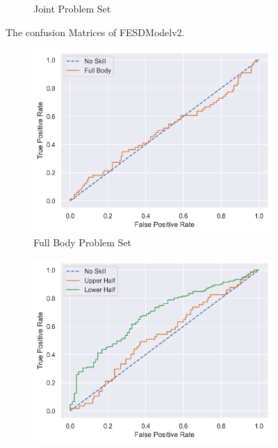\begin{figure}[htbp]
\begin{subfigure}[b]{0.4\linewidth}
      \caption{Joint Problem Set}
      \label{fig:jt_conf}
  \end{subfigure}
  \caption[Confusion Matrices of FESDModelv2]{The confusion Matrices of FESDModelv2.}
  \label{fig:conf_v2}
\end{figure}

\begin{figure}[htbp]
  \centering
  \begin{subfigure}[b]{0.4\linewidth}
      \centering
      \includegraphics[width=\textwidth]{figures/Results/v2/roc/fb.png}
      \caption[]{Full Body Problem Set}
      \label{fig:fb_roc_v2}
  \end{subfigure}
  \hfill
  \begin{subfigure}[b]{0.4\linewidth}
      \centering
      \includegraphics[width=\textwidth]{figures/Results/v2/roc/hb.png}

\end{subfigure}
\end{figure}
